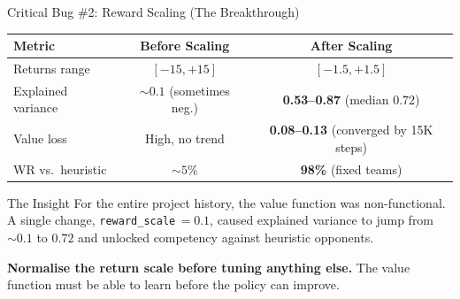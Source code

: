 \documentclass[aspectratio=169, 11pt]{beamer}
\begin{document}
\begin{frame}{Critical Bug \#2: Reward Scaling (The Breakthrough)}
  \begin{center}
    \small
    \begin{tabularx}{0.85\textwidth}{l c c}
      \toprule
      \textbf{Metric} & \textbf{Before Scaling} & \textbf{After Scaling} \\
      \midrule
      Returns range         & $[-15, +15]$          & $[-1.5, +1.5]$ \\
      Explained variance    & $\sim 0.1$ (sometimes neg.) & \textbf{0.53--0.87} (median 0.72) \\
      Value loss            & High, no trend        & \textbf{0.08--0.13} (converged by 15K steps) \\
      WR vs.\ heuristic     & $\sim 5\%$            & \textbf{98\%} (fixed teams) \\
      \bottomrule
    \end{tabularx}
  \end{center}

  \vspace{0.5em}
  \begin{exampleblock}{The Insight}
    For the entire project history, the value function was non-functional.
    A single change, \texttt{reward\_scale}$\,= 0.1$, caused explained
    variance to jump from $\sim 0.1$ to $0.72$ and unlocked competency
    against heuristic opponents.

    \vspace{0.3em}
    \textbf{Normalise the return scale before tuning anything else.}
    The value function must be able to learn before the policy can improve.
  \end{exampleblock}
\end{frame}
\end{document}
